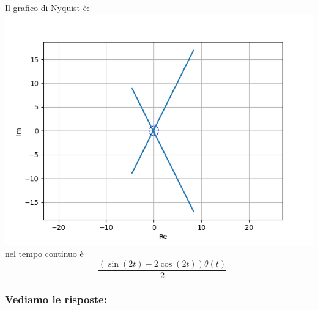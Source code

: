 \documentclass{article}
\begin{document}
Il grafico di Nyquist è:
\includegraphics[scale = 0.5]{figures/nyquist_5476825.png}nel tempo continuo è \[ - \frac{\left(\sin{\left(2 t \right)} - 2 \cos{\left(2 t \right)}\right) \theta\left(t\right)}{2} \]
\subsubsection{Vediamo le risposte:} 
\end{document}
